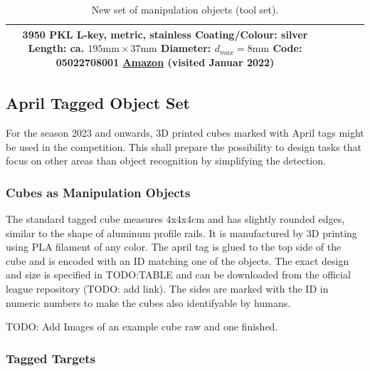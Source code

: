 {\begin{table}[h!]
\begin{tabular}{|c|m{2cm}|c|c|m{8cm}|}
		3950 PKL L-key, metric, stainless\newline
		Coating/Colour: silver \newline
		Length: ca. $195\si{\milli\meter} \times 37\si{\milli\meter}$\newline
		Diameter: $d_{max}=8\si{\milli\meter}$\newline
		Code: 05022708001 \newline
		\href{https://www.amazon.co.uk/Wera-WER022708-Hexagon-Keys-Multi-Colour/dp/B00A8QXTNG}{Amazon} (visited Januar 2022)\\
		\hline
	
\end{tabular}
\caption{\RCAW New set of manipulation objects (tool set).}
\label{tab:new_objects2}
\end{table}


\clearpage
\subsection{April Tagged Object Set}
\label{ssec: April Tagged Object Set}

For the season 2023 and onwards, 3D printed cubes marked with April tags might be used in the competition.
This shall prepare the possibility to design tasks that focus on other areas than object recognition by simplifying the detection. 

\subsubsection{Cubes as Manipulation Objects}

The standard tagged cube measures 4x4x4\si{\centi\meter} and has slightly rounded edges, similar to the shape of aluminum profile rails.
It is manufactured by 3D printing using PLA filament of any color.
The april tag is glued to the top side of the cube and is encoded with an ID matching one of the objects.
The exact design and size is specified in TODO:TABLE
and can be downloaded from the official league repository (TODO: add link).
The sides are marked with the ID in numeric numbers to make the cubes also identifyable by humans.

TODO: Add Images of an example cube raw and one finished.


\subsubsection{Tagged Targets}

}
